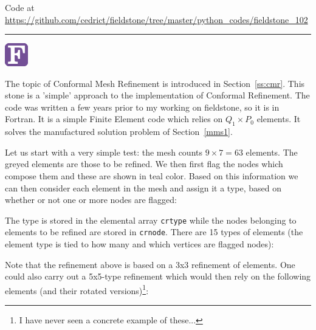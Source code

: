 

\begin{center}
Code at \url{https://github.com/cedrict/fieldstone/tree/master/python_codes/fieldstone_102}
\end{center}

\par\noindent\rule{\textwidth}{0.4pt}



\begin{center}
\includegraphics[width=1cm]{images/fortran/fortran} 
\end{center}

The topic of Conformal Mesh Refinement is introduced in Section~\ref{ss:cmr}.
This stone is a 'simple' approach to the implementation of Conformal Refinement. The code was written 
a few years prior to my working on fieldstone, so it is in Fortran. It is a 
simple Finite Element code which relies on $Q_1\times P_0$ elements. It solves the 
manufactured solution problem of Section~\ref{mms1}.

Let us start with a very simple test: the mesh counts $9\times 7=63$ elements.
The greyed elements are those to be refined. We then first flag 
the nodes which compose them and these are shown in teal color.
Based on this information we can then consider each element in the mesh and assign it a type, 
based on whether or not one or more nodes are flagged: 

\begin{center}

\end{center}

The type is stored in the elemental array {\tt crtype} while the nodes belonging to elements 
to be refined are stored in {\tt crnode}.
There are 15 types of elements (the element type is tied to how many and which vertices are flagged nodes):

\begin{center}

\end{center}

Note that the refinement above is based on a 3x3 refinement of elements. One could also carry out a 5x5-type
refinement which would then rely on the following elements (and their rotated versions)\footnote{I have never
seen a concrete example of these...}:
\begin{center}

\end{center}

